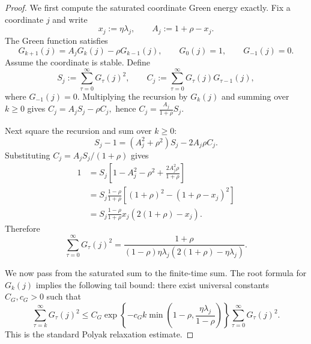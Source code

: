 \documentclass[11pt]{article}
\begin{document}
\begin{proof}
We first compute the saturated coordinate Green energy exactly. Fix a coordinate $j$ and write
\[
    x_j:=\eta\lambda_j,
    \qquad
    A_j:=1+\rho-x_j.
\]
The Green function satisfies
\[
    G_{k+1}(j)=A_jG_k(j)-\rho G_{k-1}(j),
    \qquad
    G_0(j)=1,
    \qquad
    G_{-1}(j)=0.
\]
Assume the coordinate is stable. Define
\[
    S_j:=\sum_{\tau=0}^\infty G_\tau(j)^2,
    \qquad
    C_j:=\sum_{\tau=0}^\infty G_\tau(j)G_{\tau-1}(j),
\]
where $G_{-1}(j)=0$. Multiplying the recursion by $G_k(j)$ and summing over $k\ge0$ gives
   $C_j=A_jS_j-\rho C_j,$ hence $C_j=\frac{A_j}{1+\rho}S_j.$

Next square the recursion and sum over $k\ge0$:
\[
    S_j-1
    =
    \left(A_j^2+\rho^2\right)S_j-2A_j\rho C_j.
\]
Substituting $C_j=A_jS_j/(1+\rho)$ gives
\begin{align*}
    1
    &=
    S_j\left[1-A_j^2-\rho^2+\frac{2A_j^2\rho}{1+\rho}\right] \\
    &=
    S_j\frac{1-\rho}{1+\rho}
    \left[(1+\rho)^2-(1+\rho-x_j)^2\right] \\
    &=
    S_j\frac{1-\rho}{1+\rho}
    x_j\left(2(1+\rho)-x_j\right).
\end{align*}
Therefore
\begin{equation}
\label{eq:pol_green_energy_exact}
    \sum_{\tau=0}^\infty G_\tau(j)^2
    =
    \frac{1+\rho}{(1-\rho)\eta\lambda_j\left(2(1+\rho)-\eta\lambda_j\right)}.
\end{equation}

We now pass from the saturated sum to the finite-time sum. The root formula for $G_k(j)$ implies the following tail bound: there exist universal constants $C_G,c_G>0$ such that
\begin{equation}
\label{eq:pol_green_tail_bound}
    \sum_{\tau=k}^{\infty}G_\tau(j)^2
    \le
    C_G\exp\left\{-c_G k\min\left(1-\rho,\frac{\eta\lambda_j}{1-\rho}\right)\right\}
    \sum_{\tau=0}^{\infty}G_\tau(j)^2.
\end{equation}
This is the standard Polyak relaxation estimate.


\end{proof}
\end{document}
